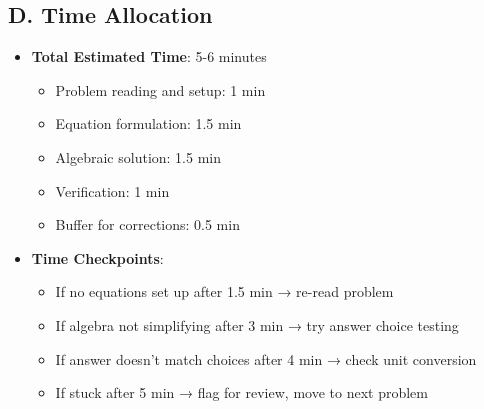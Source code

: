 \documentclass[11pt]{article}
\begin{document}
\begin{roadmapbox}
\subsection*{D. Time Allocation}
\begin{itemize}[leftmargin=*]
    \item \textbf{Total Estimated Time}: 5-6 minutes
    \begin{itemize}[leftmargin=*]
        \item Problem reading and setup: 1 min
        \item Equation formulation: 1.5 min
        \item Algebraic solution: 1.5 min
        \item Verification: 1 min
        \item Buffer for corrections: 0.5 min
    \end{itemize}
    
    \item \textbf{Time Checkpoints}:
    \begin{itemize}[leftmargin=*]
        \item If no equations set up after 1.5 min → re-read problem
        \item If algebra not simplifying after 3 min → try answer choice testing
        \item If answer doesn't match choices after 4 min → check unit conversion
        \item If stuck after 5 min → flag for review, move to next problem
    \end{itemize}
\end{itemize}
\end{roadmapbox}
\end{document}
